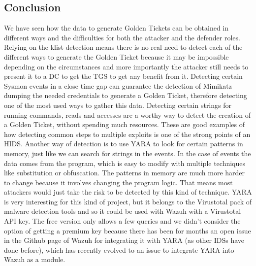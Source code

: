 \subsection{Conclusion}
We have seen how the data to generate Golden Tickets can be obtained in different ways and the difficulties for both the attacker and the defender roles.
\linej
\linej
Relying on the klist detection means there is no real need to detect each of the different ways to generate the Golden Ticket because it may be impossible depending on the circumstances and more importantly the attacker still needs to present it to a DC to get the TGS to get any benefit from it.
\linej
Detecting certain Sysmon events in a close time gap can guarantee the detection of Mimikatz dumping the needed credentials to generate a Golden Ticket, therefore detecting one of the most used ways to gather this data. Detecting certain strings for running commands, reads and accesses are a worthy way to detect the creation of a Golden Ticket, without spending much resources.
\linej
These are good examples of how detecting common steps to multiple exploits is one of the strong points of an HIDS.
\linej
\linej
Another way of detection is to use YARA to look for certain patterns in memory, just like we can search for strings in the events. In the case of events the data comes from the program, which is easy to modify with multiple techniques like substitution or obfuscation. The patterns in memory are much more harder to change because it involves changing the program logic. That means most attackers would just take the risk to be detected by this kind of technique.
\linej
YARA is very interesting for this kind of project, but it belongs to the Virustotal pack of malware detection tools and so it could be used with Wazuh with a Virustotal API key. The free version only allows a few queries and we didn't consider the option of getting a premium key because there has been for months an open issue in the Github page of Wazuh for integrating it with YARA (as other IDSs have done before), which has recently evolved to an issue to integrate YARA into Wazuh as a module\cite{yara_module}.
